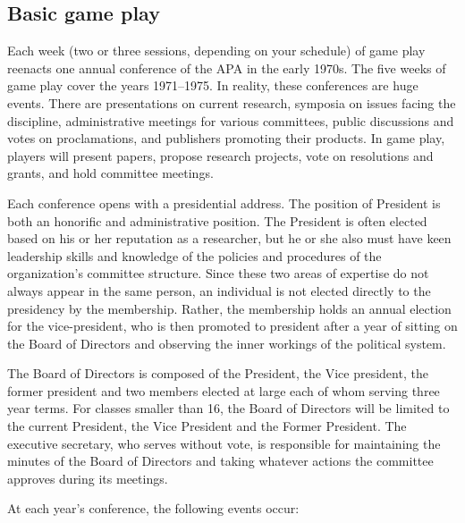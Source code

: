 \begin{refsection}
\section{Basic game play}
\label{basicgameplay}

Each week (two or three sessions, depending on your schedule) of game play reenacts one annual conference of the APA in the early 1970s. The five weeks of game play cover the years 1971--1975. In reality, these conferences are huge events. There are presentations on current research, symposia on issues facing the discipline, administrative meetings for various committees, public discussions and votes on proclamations, and publishers promoting their products. In game play, players will present papers, propose research projects, vote on resolutions and grants, and hold committee meetings.

Each conference opens with a presidential address. The position of President is both an honorific and administrative position. The President is often elected based on his or her reputation as a researcher, but he or she also must have keen leadership skills and knowledge of the policies and procedures of the organization's committee structure. Since these two areas of expertise do not always appear in the same person, an individual is not elected directly to the presidency by the membership. Rather, the membership holds an annual election for the vice-president, who is then promoted to president after a year of sitting on the Board of Directors and observing the inner workings of the political system.

The Board of Directors is composed of the President, the Vice president, the former president and two members elected at large each of whom serving three year terms. For classes smaller than 16, the Board of Directors will be limited to the current President, the Vice President and the Former President. The executive secretary, who serves without vote, is responsible for maintaining the minutes of the Board of Directors and taking whatever actions the committee approves during its meetings.

At each year's conference, the following events occur:




\begin{enumerate}


\end{enumerate}
\end{refsection}
